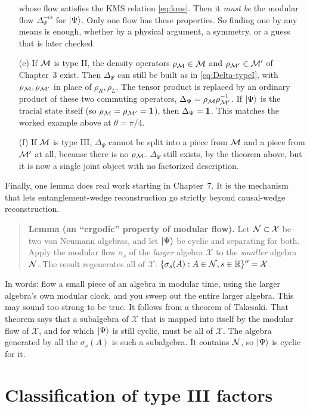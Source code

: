 \begin{itemize}
whose flow satisfies the KMS relation \eqref{eq:kms}. Then it \emph{must be} the modular flow $\Delta_\Psi^{-is}$
for $\ket\Psi$. Only one flow has these properties. So finding one by any means is enough, whether by a
physical argument, a symmetry, or a guess that is later checked.
\item[(e)] If $\mathcal{M}$ is type II, the density operators $\rho_{\mathcal{M}}\in\mathcal{M}$ and $\rho_{\mathcal{M}'}\in\mathcal{M}'$ of Chapter~3 exist.
Then $\Delta_\Psi$ can still be built as in \eqref{eq:Delta-typeI}, with $\rho_{\mathcal{M}},\rho_{\mathcal{M}'}$ in place of
$\rho_R,\rho_L$. The tensor product is replaced by an ordinary product of these two commuting operators,
$\Delta_\Psi=\rho_{\mathcal{M}}\rho_{\mathcal{M}'}^{-1}$. If $\ket\Psi$ is the tracial state itself (so
$\rho_{\mathcal{M}}=\rho_{\mathcal{M}'}=\mathbf{1}$), then $\Delta_\Psi=\mathbf{1}$. This matches the worked example above at $\theta=\pi/4$.
\item[(f)] If $\mathcal{M}$ is type III, $\Delta_\Psi$ cannot be split into a piece from $\mathcal{M}$ and a piece from $\mathcal{M}'$ at
all, because there is no $\rho_{\mathcal{M}}$. $\Delta_\Psi$ still exists, by the theorem above, but it is now a single
joint object with no factorized description.
\end{itemize}

Finally, one lemma does real work starting in Chapter~7. It is the mechanism that lets entanglement-wedge
reconstruction go strictly beyond causal-wedge reconstruction.

\begin{quote}
\textbf{Lemma (an ``ergodic'' property of modular flow).} Let $\mathcal{N}\subset\mathcal X$ be two von Neumann
algebras, and let $\ket\Psi$ be cyclic and separating for both. Apply the modular flow $\sigma_s$ of the
\emph{larger} algebra $\mathcal X$ to the \emph{smaller} algebra $\mathcal{N}$. The result regenerates all of
$\mathcal X$: $\{\sigma_s(A):A\in\mathcal{N}, s\in\mathbb R\}''=\mathcal X$.
\end{quote}
In words: flow a small piece of an algebra in modular time, using the larger algebra's own modular clock, and
you sweep out the entire larger algebra. This may sound too strong to be true. It follows from a theorem of
Takesaki. That theorem says that a subalgebra of $\mathcal X$ that is mapped into itself by the modular flow
of $\mathcal X$, and for which $\ket\Psi$ is still cyclic, must be all of $\mathcal X$. The algebra generated by
all the $\sigma_s(A)$ is such a subalgebra. It contains $\mathcal{N}$, so $\ket\Psi$ is cyclic for it.

\section{Classification of type III factors}

